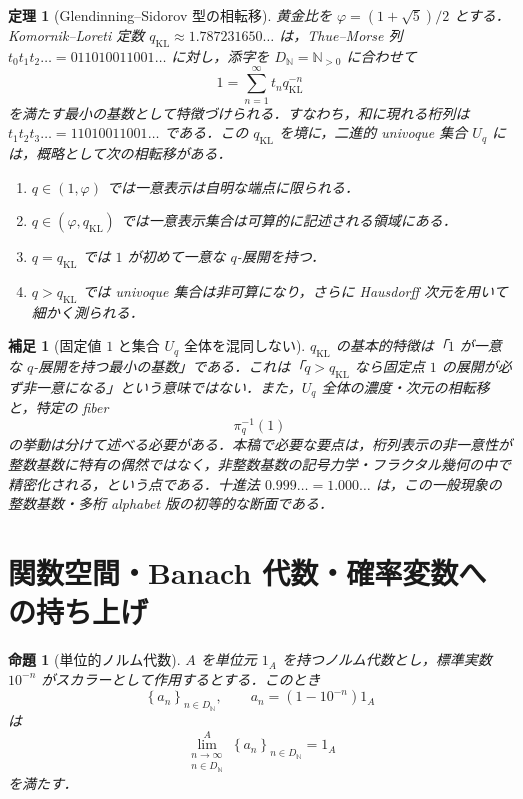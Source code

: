 \documentclass[a4paper,11pt]{ltjsarticle}
\theoremstyle{jpdef}
\newtheorem{remark}[definition]{補足}
\theoremstyle{jpthm}
\newtheorem{theorem}[definition]{定理}
\newtheorem{proposition}[definition]{命題}
\newcommand{\N}{\mathbb{N}}
\newcommand{\DN}{D_{\N}}
\newcommand{\seq}[2]{\left\{#1\right\}_{#2}}
\newcommand{\KL}{q_{\mathrm{KL}}}
\begin{document}
\begin{theorem}[Glendinning--Sidorov 型の相転移]
黄金比を \(\varphi=(1+\sqrt5)/2\) とする．Komornik--Loreti 定数 \(\KL\approx1.787231650\ldots\) は，Thue--Morse 列 \(t_0t_1t_2\ldots=011010011001\ldots\) に対し，添字を \(\DN=\N_{>0}\) に合わせて
\[
  1=\sum_{n=1}^{\infty}t_n \KL^{-n}
\]
を満たす最小の基数として特徴づけられる．すなわち，和に現れる桁列は \(t_1t_2t_3\ldots=11010011001\ldots\) である．この \(\KL\) を境に，二進的 univoque 集合 \(U_q\) には，概略として次の相転移がある．
\begin{enumerate}
\item \(q\in(1,\varphi)\) では一意表示は自明な端点に限られる．
\item \(q\in(\varphi,\KL)\) では一意表示集合は可算的に記述される領域にある．
\item \(q=\KL\) では \(1\) が初めて一意な \(q\)-展開を持つ．
\item \(q>\KL\) では univoque 集合は非可算になり，さらに Hausdorff 次元を用いて細かく測られる．
\end{enumerate}
\end{theorem}

\begin{remark}[固定値 \(1\) と集合 \(U_q\) 全体を混同しない]
\(\KL\) の基本的特徴は「\(1\) が一意な \(q\)-展開を持つ最小の基数」である．これは「\(q>\KL\) なら固定点 \(1\) の展開が必ず非一意になる」という意味ではない．また，\(U_q\) 全体の濃度・次元の相転移と，特定の fiber
\[
  \pi_q^{-1}(1)
\]
の挙動は分けて述べる必要がある．本稿で必要な要点は，桁列表示の非一意性が整数基数に特有の偶然ではなく，非整数基数の記号力学・フラクタル幾何の中で精密化される，という点である．十進法 \(0.999\ldots=1.000\ldots\) は，この一般現象の整数基数・多桁 alphabet 版の初等的な断面である．
\end{remark}


\section{関数空間・Banach 代数・確率変数への持ち上げ}

\begin{proposition}[単位的ノルム代数]
\(A\) を単位元 \(1_A\) を持つノルム代数とし，標準実数 \(10^{-n}\) がスカラーとして作用するとする．このとき
\[
  \seq{a_n}{n\in\DN},\qquad a_n=(1-10^{-n})1_A
\]
は
\[
  \lim_{\substack{n\to\infty\\ n\in\DN}}^{A}\seq{a_n}{n\in\DN}=1_A
\]
を満たす．
\end{proposition}
\end{document}
